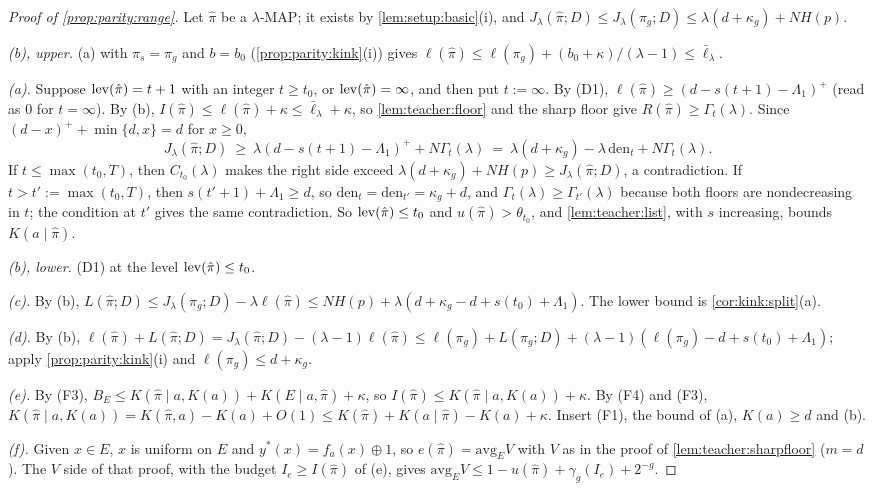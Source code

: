 \begin{proof}[Proof of \cref{prop:parity:range}]
Let $\hat\pi$ be a $\lambda$-MAP; it exists by \cref{lem:setup:basic}(i), and $J_\lambda(\hat\pi;D)\le J_\lambda(\pi_g;D)\le\lambda(d+\kappa_g)+NH(p)$.

\emph{(b), upper.} (a) with $\pi_s=\pi_g$ and $b=b_0$ (\cref{prop:parity:kink}(i)) gives $\ell(\hat\pi)\le\ell(\pi_g)+(b_0+\kappa)/(\lambda-1)\le\bar\ell_\lambda$.

\emph{(a).} Suppose $\operatorname{lev}(\hat\pi)=t+1$ with an integer $t\ge t_0$, or $\operatorname{lev}(\hat\pi)=\infty$, and then put $t:=\infty$. By (D1), $\ell(\hat\pi)\ge(d-s(t+1)-\Lambda_1)^+$ (read as $0$ for $t=\infty$). By (b), $I(\hat\pi)\le\ell(\hat\pi)+\kappa\le\bar\ell_\lambda+\kappa$, so \cref{lem:teacher:floor} and the sharp floor give $R(\hat\pi)\ge\Gamma_t(\lambda)$. Since $(d-x)^++\min\{d,x\}=d$ for $x\ge0$,
\[
J_\lambda(\hat\pi;D)\ \ge\ \lambda(d-s(t+1)-\Lambda_1)^++N\Gamma_t(\lambda)\ =\ \lambda(d+\kappa_g)-\lambda\,\mathrm{den}_t+N\Gamma_t(\lambda).
\]
If $t\le\max(t_0,T)$, then $C_{t_0}(\lambda)$ makes the right side exceed $\lambda(d+\kappa_g)+NH(p)\ge J_\lambda(\hat\pi;D)$, a contradiction. If $t>t':=\max(t_0,T)$, then $s(t'+1)+\Lambda_1\ge d$, so $\mathrm{den}_t=\mathrm{den}_{t'}=\kappa_g+d$, and $\Gamma_t(\lambda)\ge\Gamma_{t'}(\lambda)$ because both floors are nondecreasing in $t$; the condition at $t'$ gives the same contradiction. So $\operatorname{lev}(\hat\pi)\le t_0$ and $u(\hat\pi)>\theta_{t_0}$, and \cref{lem:teacher:list}, with $s$ increasing, bounds $K(a\mid\hat\pi)$.

\emph{(b), lower.} (D1) at the level $\operatorname{lev}(\hat\pi)\le t_0$.

\emph{(c).} By (b), $L(\hat\pi;D)\le J_\lambda(\pi_g;D)-\lambda\ell(\hat\pi)\le NH(p)+\lambda(d+\kappa_g-d+s(t_0)+\Lambda_1)$. The lower bound is \cref{cor:kink:split}(a).

\emph{(d).} By (b), $\ell(\hat\pi)+L(\hat\pi;D)=J_\lambda(\hat\pi;D)-(\lambda-1)\ell(\hat\pi)\le\ell(\pi_g)+L(\pi_g;D)+(\lambda-1)(\ell(\pi_g)-d+s(t_0)+\Lambda_1)$; apply \cref{prop:parity:kink}(i) and $\ell(\pi_g)\le d+\kappa_g$.

\emph{(e).} By (F3), $B_E\le K(\hat\pi\mid a,K(a))+K(E\mid a,\hat\pi)+\kappa$, so $I(\hat\pi)\le K(\hat\pi\mid a,K(a))+\kappa$. By (F4) and (F3), $K(\hat\pi\mid a,K(a))=K(\hat\pi,a)-K(a)+O(1)\le K(\hat\pi)+K(a\mid\hat\pi)-K(a)+\kappa$. Insert (F1), the bound of (a), $K(a)\ge d$ and (b).

\emph{(f).} Given $x\in E$, $x$ is uniform on $E$ and $y^*(x)=f_a(x)\oplus1$, so $e(\hat\pi)=\mathrm{avg}_EV$ with $V$ as in the proof of \cref{lem:teacher:sharpfloor} ($m=d$). The $V$ side of that proof, with the budget $I_e\ge I(\hat\pi)$ of (e), gives $\mathrm{avg}_EV\le1-u(\hat\pi)+\gamma_g(I_e)+2^{-g}$.


\end{proof}
